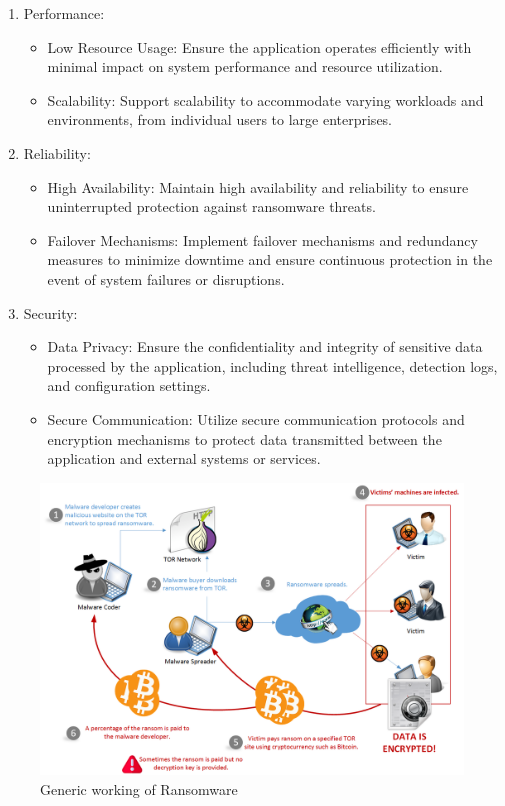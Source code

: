 \documentclass[12pt,twocolumn]{article}
\begin{document}
\begin{enumerate}
    \item Performance:

        \begin{itemize}
            \item Low Resource Usage: Ensure the application operates efficiently with minimal impact on system performance and resource utilization.

            \item Scalability: Support scalability to accommodate varying workloads and environments, from individual users to large enterprises.
        \end{itemize}
    \item Reliability:
        \begin{itemize}
            \item High Availability: Maintain high availability and reliability to ensure uninterrupted protection against ransomware threats.

            \item Failover Mechanisms: Implement failover mechanisms and redundancy measures to minimize downtime and ensure continuous protection in the event of system failures or disruptions.
        \end{itemize}


    \item Security:
    \begin{itemize}
            \item Data Privacy: Ensure the confidentiality and integrity of sensitive data processed by the application, including threat intelligence, detection logs, and configuration settings.

            \item Secure Communication: Utilize secure communication protocols and encryption mechanisms to protect data transmitted between the application and external systems or services.
    \end{itemize}
\end{enumerate}

\begin{figure}[ht]
  \includegraphics[width=\textwidth, height= 8.5 cm]{images/20180214-Free-Ransomware-1.png} %
  \caption{Generic working of Ransomware}
  \label{fig:Working of Ransomware}
\end{figure}
\end{document}
